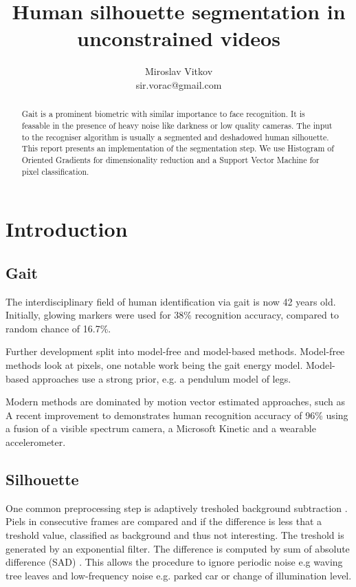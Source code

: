 \documentclass{article}
\title{Human silhouette segmentation in unconstrained videos}
\author{Miroslav Vitkov \\ sir.vorac@gmail.com}
\begin{document}
\maketitle


\begin{abstract}
Gait is a prominent biometric with similar importance to face recognition.
It is feasable in the presence of heavy noise like darkness or low quality cameras.
The input to the recogniser algorithm is usually a segmented and deshadowed human silhouette.
This report presents an implementation of the segmentation step.
We use Histogram of Oriented Gradients for dimensionality reduction  and a Support Vector Machine for pixel classification.
\end{abstract}


\section{Introduction}
\subsection{Gait}
The interdisciplinary field of human identification via gait is now 42 years old.
Initially, glowing markers were used\cite{begin} for 38\% recognition accuracy, compared to random chance of 16.7\%.

Further development split into model-free and model-based methods.
Model-free methods look at pixels, one notable work being the gait energy model\cite{energy}.
Model-based approaches use a strong prior, e.g. a pendulum model of legs\cite{pendulum}.

Modern methods are dominated by motion vector estimated approaches, such as \cite{pyramid}
A recent improvement to \cite{pyramid} demonstrates human recognition accuracy of 96\% using a fusion of a visible spectrum camera, a Microsoft Kinetic and a wearable accelerometer\cite{robust}.


\subsection{Silhouette}
One common preprocessing step is adaptively tresholed background subtraction \cite{vehicle}.
Piels in consecutive frames are compared and if the difference is less that a treshold value, classified as background and thus not interesting.
The treshold is generated by an exponential filter.
The difference is computed by sum of absolute difference (SAD) \cite{background}.
This allows the procedure to ignore periodic noise e.g waving tree leaves and low-frequency noise e.g. parked car or change of illumination level.
\end{document}
